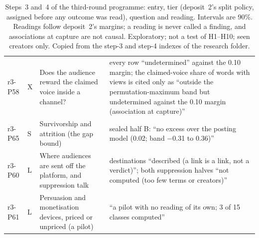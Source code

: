 \begin{table}[tp]
\begin{tabular}{@{}>{\raggedright\arraybackslash}p{}>{\raggedright\arraybackslash}p{}>{\raggedright\arraybackslash}p{}p{}@{}}
r3-P58 & X & Does the audience reward the claimed voice inside a channel? & every row ``undetermined'' against the
0.10 margin; the claimed-voice share of words with views is cited only as ``outside the permutation-maximum band but
undetermined against the 0.10 margin (association at capture)'' \\
r3-P65 & S & Survivorship and attrition (the gap bound) & sealed half B: ``no excess over the posting model (0.02;
band $-$0.31 to 0.36)'' \\
r3-P60 & L & Where audiences are sent off the platform, and suppression talk & destinations ``described (a link is a
link, not a verdict)''; both suppression halves ``not computed (too few terms or creators)'' \\
r3-P61 & L & Persuasion and monetisation devices, priced or unpriced (a pilot) & ``a pilot with no reading of its own; 3
of 15 classes computed'' \\
\bottomrule
\end{tabular}
\caption{Steps~3 and~4 of the third-round programme: entry, tier (deposit~2's split policy, assigned before any outcome
was read), question and reading. Intervals are 90\%. Readings follow deposit~2's margins; a reading is never called a
finding, and associations at capture are not causal. Exploratory; not a test of H1--H10; seen creators only. Copied from
the step-3 and step-4 indexes of the research folder. \LabelValidity}
\label{tab:panel3-step34}
\end{table}

